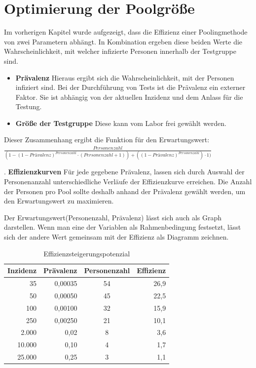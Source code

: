 \section{Optimierung der Poolgröße}
Im vorherigen Kapitel wurde aufgezeigt, dass die Effizienz einer Poolingmethode von zwei Parametern abhängt.
In Kombination ergeben diese beiden Werte die Wahrscheinlichkeit, mit welcher infizierte Personen innerhalb der Testgruppe sind.
\begin{itemize}
	\item \textbf{Prävalenz} Hieraus ergibt sich die Wahrscheinlichkeit, mit der Personen infiziert sind.
	Bei der Durchführung von Tests ist die Prävalenz ein externer Faktor.
	Sie ist abhängig von der aktuellen Inzidenz und dem Anlass für die Testung.
	\item \textbf{Größe der Testgruppe} Diese kann vom Labor frei gewählt werden.
\end{itemize}

Dieser Zusammenhang ergibt die Funktion für den Erwartungswert:\newline
$\frac{Personenzahl}{(1 - (1-Prävalenz)^{Personenzahl} \cdot (Personenzahl + 1)) + ((1-Prävalenz)^{Personenzahl}) \cdot 1)}$

.\newline
\textbf{Effizienzkurven}\newline
Für jede gegebene Prävalenz, lassen sich durch Auswahl der Personenanzahl unterschiedliche Verläufe der Effizienzkurve erreichen.
Die Anzahl der Personen pro Pool sollte deshalb anhand der Prävalenz gewählt werden, um den Erwartungswert zu maximieren.

Der Erwartungswert(Personenzahl, Prävalenz) lässt sich auch als Graph darstellen.
Wenn man eine der Variablen als Rahmenbedingung festsetzt, lässt sich der andere Wert gemeinsam mit der Effizienz als Diagramm zeichnen.

\begin{table}[h]
	\centering
	\begin{tabular}{|r|r|c|r|}
		\hline
		Inzidenz&Prävalenz&Personenzahl &Effizienz\\
		\hline
		35 & 0,00035 & 54 & 26,9\\
		\hline
		50 & 0,00050 & 45 & 22,5 \\
		\hline
		100 & 0,00100 & 32 & 15,9 \\
		\hline
		250 & 0,00250 & 21 & 10,1 \\
		\hline
		2.000 & 0,02 & 8 & 3,6\\
		\hline
		10.000 & 0,10  & 4 & 1,7\\
		\hline
		25.000 & 0,25 & 3 & 1,1\\
		\hline
	\end{tabular}
	\caption{Effizienzsteigerungspotenzial\footnotemark}
\end{table} 

